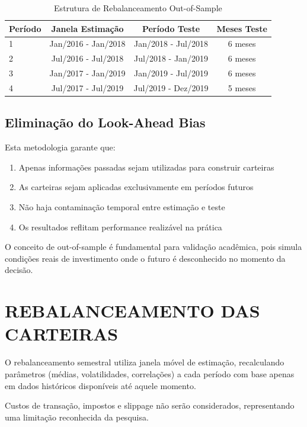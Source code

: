 \begin{table}[H]
\centering
\caption{Estrutura de Rebalanceamento Out-of-Sample}
\begin{tabular}{lccc}
\toprule
\textbf{Período} & \textbf{Janela Estimação} & \textbf{Período Teste} & \textbf{Meses Teste} \\
\midrule
1 & Jan/2016 - Jan/2018 & Jan/2018 - Jul/2018 & 6 meses \\
2 & Jul/2016 - Jul/2018 & Jul/2018 - Jan/2019 & 6 meses \\
3 & Jan/2017 - Jan/2019 & Jan/2019 - Jul/2019 & 6 meses \\
4 & Jul/2017 - Jul/2019 & Jul/2019 - Dez/2019 & 5 meses \\
\bottomrule
\end{tabular}
\label{tab:rebalanceamento}
\end{table}

\subsection{Eliminação do Look-Ahead Bias}

Esta metodologia garante que:
\begin{enumerate}
    \item Apenas informações passadas sejam utilizadas para construir carteiras
    \item As carteiras sejam aplicadas exclusivamente em períodos futuros
    \item Não haja contaminação temporal entre estimação e teste
    \item Os resultados reflitam performance realizável na prática
\end{enumerate}

O conceito de out-of-sample é fundamental para validação acadêmica, pois simula condições reais de investimento onde o futuro é desconhecido no momento da decisão.

\section{REBALANCEAMENTO DAS CARTEIRAS}

O rebalanceamento semestral utiliza janela móvel de estimação, recalculando parâmetros (médias, volatilidades, correlações) a cada período com base apenas em dados históricos disponíveis até aquele momento.

Custos de transação, impostos e slippage não serão considerados, representando uma limitação reconhecida da pesquisa.

